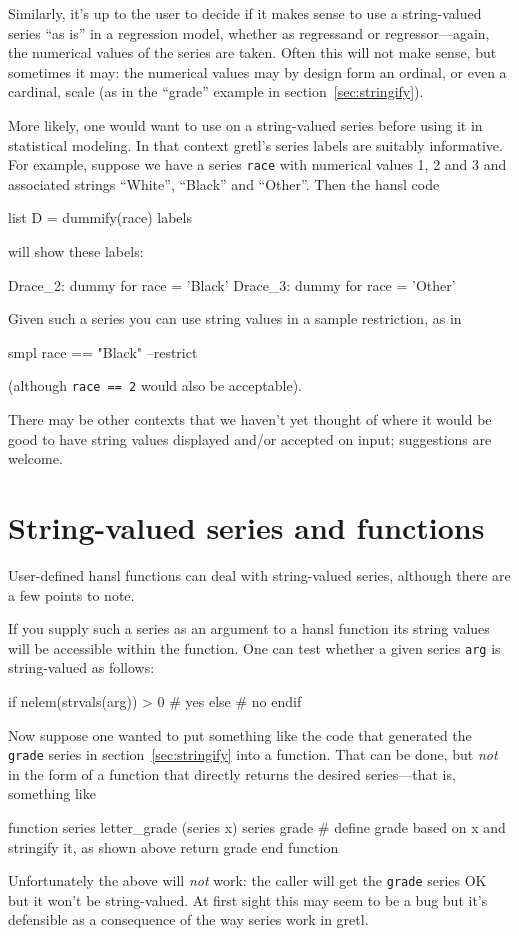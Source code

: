 Similarly, it's up to the user to decide if it makes sense to use a
string-valued series ``as is'' in a regression model, whether as
regressand or regressor---again, the numerical values of the series
are taken. Often this will not make sense, but sometimes it may: the
numerical values may by design form an ordinal, or even a cardinal,
scale (as in the ``grade'' example in section~\ref{sec:stringify}).

More likely, one would want to use  on a string-valued
series before using it in statistical modeling. In that context
gretl's series labels are suitably informative. For example, suppose
we have a series \texttt{race} with numerical values 1, 2 and 3 and
associated strings ``White'', ``Black'' and ``Other''. Then the hansl
code
\begin{code}
list D = dummify(race)
labels
\end{code}
will show these labels:
\begin{code}
Drace_2: dummy for race = 'Black'
Drace_3: dummy for race = 'Other'
\end{code}

Given such a series you can use string values in a sample restriction,
as in
\begin{code}
smpl race == "Black" --restrict
\end{code}
(although \texttt{race == 2} would also be acceptable).

There may be other contexts that we haven't yet thought of where it
would be good to have string values displayed and/or accepted on
input; suggestions are welcome.

\section{String-valued series and functions}

User-defined hansl functions can deal with string-valued series,
although there are a few points to note.

If you supply such a series as an argument to a hansl function its
string values will be accessible within the function. One can test
whether a given series \texttt{arg} is string-valued as follows:
\begin{code}
if nelem(strvals(arg)) > 0
  # yes
else
  # no
endif
\end{code}

Now suppose one wanted to put something like the code that generated
the \texttt{grade} series in section~\ref{sec:stringify} into a
function. That can be done, but \textit{not} in the form of a function
that directly returns the desired series---that is, something like
\begin{code}
function series letter_grade (series x)
  series grade
  # define grade based on x and stringify it, as shown above
  return grade
end function
\end{code}
%
Unfortunately the above will \emph{not} work: the caller will get the
\texttt{grade} series OK but it won't be string-valued. At first sight
this may seem to be a bug but it's defensible as a consequence of the
way series work in gretl.

